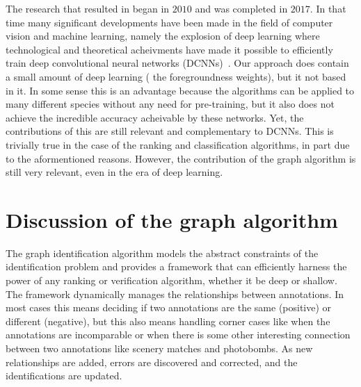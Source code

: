     The research that resulted in \thesis{} began in $2010$ and was completed in $2017$.
    In that time many significant developments have been made in the field of computer vision and machine
      learning, namely the explosion of deep learning where technological and theoretical acheivments have made it
      possible to efficiently train deep convolutional neural networks (DCNNs)~\cite{lecun_deep_2015}.
    Our approach does contain a small amount of deep learning (\eg{} the foregroundness weights), but it not
      based in it.
    In some sense this is an advantage because the algorithms can be applied to many different species without
      any need for pre-training, but it also does not achieve the incredible accuracy acheivable by these networks.
    Yet, the contributions of this \thesis{} are still relevant and complementary to DCNNs.
    This is trivially true in the case of the ranking and classification algorithms, in part due to the
      aformentioned reasons.
    However, the contribution of the graph algorithm is still very relevant, even in the era of deep learning.
    
    \section{Discussion of the graph algorithm}
    The graph identification algorithm models the abstract constraints of the identification problem and provides
      a framework that can efficiently harness the power of any ranking or verification algorithm, whether it be
      deep or shallow.
    The framework dynamically manages the relationships between annotations.
    In most cases this means deciding if two annotations are the same (positive) or different (negative), but
      this also means handling corner cases like when the annotations are incomparable or when there is some other
      interesting connection between two annotations like scenery matches and photobombs.
    As new relationships are added, errors are discovered and corrected, and the identifications are updated.

